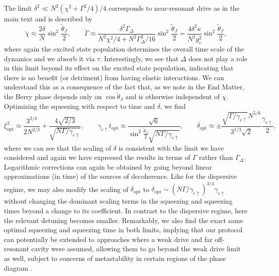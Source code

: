 \documentclass[11pt]{article}
\begin{document}
The limit $\delta^2 \ll N^2 (\chi^2 + \Gamma^2/4)/4$ corresponds to near-resonant drive as in the main text and is described by
\begin{equation}
    \check{\chi} \approx  \frac{2 \delta }{N} \sin^2 \frac{\tilde{\theta}_J}{2}, \qquad \check{\Gamma} \approx \frac{\delta^2 \Gamma_\Delta}{N^2 \chi^2/4+N^2 \Gamma_\Delta^2/16} \sin^2 \frac{\tilde{\theta}_J}{2} = \frac{ 4 \delta^2 \kappa}{N^2 g_c^2} \sin^2 \frac{\tilde{\theta}_J}{2},
\end{equation}
where again the excited state population determines the overall time scale of the dynamics and we absorb it via $\tau$. 
Interestingly, we see that $\Delta$ does not play a role in this limit beyond its effect on the excited state population, indicating that there is no benefit (or detriment) from having elastic interactions. We can understand this as a consequence of the fact that, as we note in the End Matter, the Berry phase depends only on $\cos \tilde{\theta}_J$ and is otherwise independent of $\chi$. Optimizing the squeezing with respect to time and $\delta$, we find
\begin{equation}
    \xi^2_{\text{opt}} \approx  \frac{3^{2/3}}{2 N^{2/3}} + \frac{4 \sqrt{2/3}}{\sqrt{N \Gamma/\gamma_{e \uparrow}}} , \qquad \gamma_{e \uparrow} t_{\text{opt}} \approx \frac{\sqrt{6}}{ \sin^2 \frac{\tilde{\theta}_J}{2} \sqrt{N \Gamma/ \gamma_{e \uparrow}}}, \qquad \delta_{\text{opt}} \approx \pm \frac{\sqrt{\Gamma/\gamma_{e \uparrow}} N^{5/6}}{3^{1/3} \sqrt{2} } \frac{\gamma_{e \uparrow}}{2},
\end{equation}
where we can see that the scaling of $\delta$ is consistent with the limit we have considered and again we have expressed the results in terms of $\Gamma$ rather than $\Gamma_\Delta$. Logarithmic corrections can again be obtained by going beyond linear approximations (in time) of the sources of decoherence. Like for the dispersive regime, we may also modify the scaling of $\delta_{\text{opt}}$ to $\delta_{\text{opt}} \sim (N \Gamma/\gamma_{e \uparrow})^{3/4} \gamma_{e \uparrow}$ without changing the dominant scaling terms in the squeezing and squeezing times beyond a change to its coefficient. In contrast to the dispersive regime, here the relevant detuning becomes smaller. Remarkably, we also find the exact same optimal squeezing and squeezing time in both limits, implying that our protocol can potentially be extended to approaches where a weak drive and far off-resonant cavity were assumed, allowing them to go beyond the weak drive limit as well, subject to concerns of metastability in certain regions of the phase diagram \cite{Barberena2019}.
\end{document}
